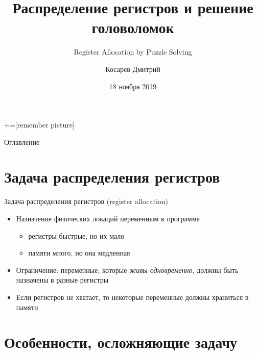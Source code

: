 \documentclass[aspectratio=169
  , xcolor={svgnames}
  , hyperref={ colorlinks,citecolor=DeepPink4
             , linkcolor=DarkRed,urlcolor=DarkBlue}
  , russian
  ]{beamer}
\title[]{Распределение регистров и решение головоломок}
\subtitle{Register Allocation by Puzzle Solving}
\author{Косарев Дмитрий }
\institute{матмех СПбГУ}
\date{18 ноября 2019}
\theoremstyle{exerciseStyle1}
\begin{document}
\maketitle

+=[remember picture] 

\everymath{\displaystyle}

\begin{frame}{Оглавление}
  \tableofcontents[]
\end{frame}

\section{Задача распределения регистров}

\begin{frame}{Задача распределения регистров (register allocation)}
\begin{itemize}
  \item Назначение физических локаций переменным в программе
    \begin{itemize}
      \item регистры быстрые, но их мало
      \item памяти много, но она медленная
    \end{itemize}
  \item Ограничение: переменные, которые \emph{живы одновременно}, должны быть назначены в разные регистры
  \item Если регистров не хватает, то некоторые переменные должны храниться в памяти
\end{itemize}
\end{frame}

\section{Особенности, осложняющие задачу}
\end{document}
